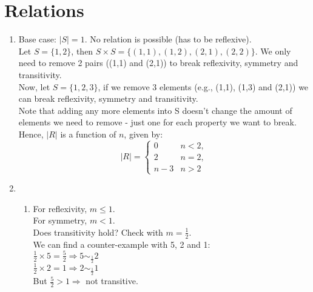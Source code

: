 \documentclass[a4paper, 12pt]{article}
\begin{document}
\section*{Relations}
\begin{enumerate}
    \item Base case: $|S| = 1$. No relation is possible (has to be reflexive). \\

    \noindent Let $S = \{1, 2\}$, then $S \times S = \{(1,1), (1,2), (2,1), (2,2)\}$. We only need to remove 2 pairs ((1,1) and (2,1)) to break reflexivity, symmetry and transitivity. \\

    \noindent Now, let $S = \{1, 2, 3\}$, if we remove 3 elements (e.g., (1,1), (1,3) and (2,1)) we can break reflexivity, symmetry and transitivity. \\
    \noindent Note that adding any more elements into S doesn't change the amount of elements we need to remove - just one for each property we want to break. \\

    \noindent Hence, $|R|$ is a function of $n$, given by:
    \begin{equation*}
        |R| = 
            \begin{cases}
                0 & n < 2, \\
                2 & n = 2, \\
                n-3 & n > 2
            \end{cases}
    \end{equation*}

    \pagebreak
    \item 
    \begin{enumerate}
        \item For reflexivity, $m \leq 1$. \\
        \noindent For symmetry, $m < 1$. \\

        \noindent Does transitivity hold? Check with $m = \frac{1}{2}$. \\
        \noindent We can find a counter-example with 5, 2 and 1: \\
            $\frac{1}{2} \times 5 = \frac{5}{2} \Rightarrow 5 \sim_{\frac{1}{2}} 2$ \\
            $\frac{1}{2} \times 2 = 1 \Rightarrow 2 \sim_{\frac{1}{2}} 1$ \\
            But $ \frac{5}{2} > 1 \Rightarrow$ not transitive. \\


\end{enumerate}
\end{enumerate}
\end{document}
